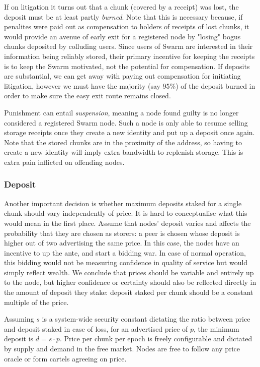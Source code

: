 If on litigation it turns out that a chunk (covered by a receipt) was lost, the deposit must be at least partly \emph{burned}. Note that this is necessary because, if penalites were paid out as compensation to holders of receipts of lost chunks, it would provide an avenue of early exit for a registered node by "losing" bogus chunks deposited by colluding users. Since users of Swarm are interested in their information being reliably stored, their primary incentive for keeping the receipts is to keep the Swarm motivated, not the potential for compensation. If deposits are substantial, we can get away with paying out compensation for initiating litigation, however we must have the majority (say 95\%) of the deposit burned in order to make sure the easy exit route remains closed.

Punishment can entail \emph{suspension}, meaning a node found guilty is no longer considered a registered Swarm node. Such a node is only able to resume selling storage receipts once they create a new identity and put up a deposit once again. Note that the stored chunks are in the proximity of the address, so having to create a new identity will imply extra bandwidth to replenish storage. This is extra pain inflicted on offending nodes.


\subsubsection{Deposit}

Another important decision is whether maximum deposits staked for a single chunk should vary independently of price. It is hard to conceptualise what this would mean in the first place. Assume that nodes' deposit varies and affects the probability that they are chosen as storers: a peer is chosen whose deposit is higher out of two advertising the same price. In this case, the nodes have an incentive to up the ante, and start a bidding war. In case of normal operation, this bidding would not be measuring confidence in quality of service but would simply reflect wealth. We conclude that prices should be variable and entirely up to the node, but higher confidence or certainty should also be reflected directly in the amount of deposit they stake: deposit staked per chunk should be a constant multiple of the price.

Assuming $s$ is a system-wide security constant dictating the ratio between price and deposit staked in case of loss, for an advertised price of $p$, the minimum deposit is $d=s\cdot p$. Price per chunk per epoch is freely configurable and dictated by supply and demand in the free market. Nodes are free to follow any price oracle or form cartels agreeing on price.

